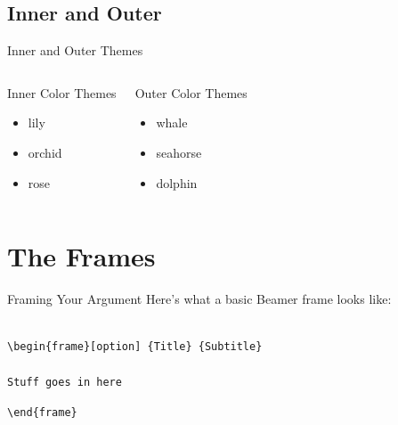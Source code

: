 \documentclass[mathserif, xcolor=svgnames]{beamer}
\begin{document}
\subsection{Inner and Outer}
\begin{frame} {Inner and Outer Themes}
\begin{columns}[t]
\begin{block}{Inner Color Themes}
\begin{itemize}
\item lily
\item orchid
\item rose
\end{itemize}
\end{block}
\begin{block}{Outer Color Themes}
\begin{itemize}
\item whale
\item seahorse
\item dolphin
\end{itemize}
\end{block}
\end{columns}
\end{frame}


\section{The Frames}

\begin{frame}[fragile]{Framing Your Argument}
Here's what a basic Beamer frame looks like:

\begin{verbatim}

\begin{frame}[option] {Title} {Subtitle}

Stuff goes in here
\end{verbatim}
\verb+\end{frame}+

\end{frame}
\end{document}
